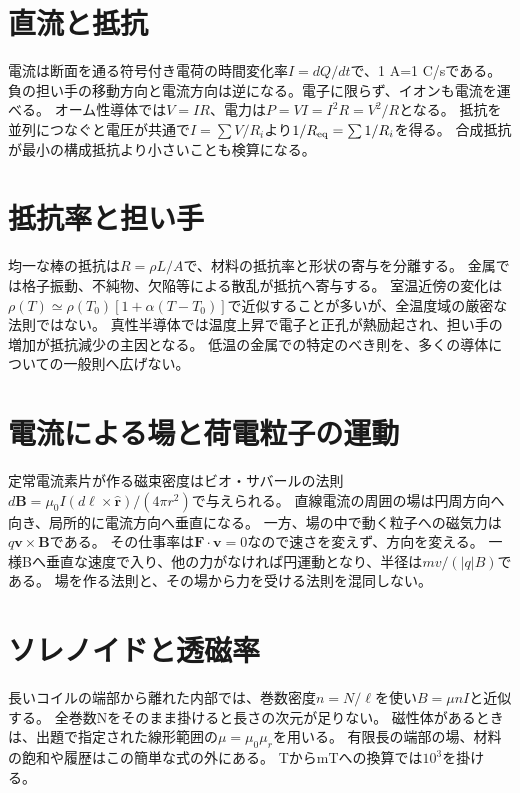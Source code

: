 \section{直流と抵抗}\label{theory:em:dc}
電流は断面を通る符号付き電荷の時間変化率$I=dQ/dt$で、1 A=1 C/sである。
負の担い手の移動方向と電流方向は逆になる。電子に限らず、イオンも電流を運べる。
オーム性導体では$V=IR$、電力は$P=VI=I^2R=V^2/R$となる。
抵抗を並列につなぐと電圧が共通で$I=\sum V/R_i$より$1/R_{\rm eq}=\sum1/R_i$を得る。
合成抵抗が最小の構成抵抗より小さいことも検算になる。\autocite{mit_em06,mit_em07}

\section{抵抗率と担い手}\label{theory:em:resistivity}
均一な棒の抵抗は$R=\rho L/A$で、材料の抵抗率と形状の寄与を分離する。
金属では格子振動、不純物、欠陥等による散乱が抵抗へ寄与する。
室温近傍の変化は$\rho(T)\simeq\rho(T_0)[1+\alpha(T-T_0)]$で近似することが多いが、全温度域の厳密な法則ではない。
真性半導体では温度上昇で電子と正孔が熱励起され、担い手の増加が抵抗減少の主因となる。
低温の金属での特定のべき則を、多くの導体についての一般則へ広げない。\autocite{mit_em06,mit_semiconductor}

\section{電流による場と荷電粒子の運動}\label{theory:em:biot}\label{theory:em:lorentz}
定常電流素片が作る磁束密度はビオ・サバールの法則
$d\mathbf B=\mu_0I(d\boldsymbol\ell\times\hat{\mathbf r})/(4\pi r^2)$で与えられる。
直線電流の周囲の場は円周方向へ向き、局所的に電流方向へ垂直になる。
一方、場の中で動く粒子への磁気力は$q\mathbf v\times\mathbf B$である。
その仕事率は$\mathbf F\cdot\mathbf v=0$なので速さを変えず、方向を変える。
一様Bへ垂直な速度で入り、他の力がなければ円運動となり、半径は$mv/(|q|B)$である。
場を作る法則と、その場から力を受ける法則を混同しない。\autocite{mit_em09,mit_lorentz}

\section{ソレノイドと透磁率}\label{theory:em:solenoid}
長いコイルの端部から離れた内部では、巻数密度$n=N/\ell$を使い$B=\mu nI$と近似する。
全巻数Nをそのまま掛けると長さの次元が足りない。
磁性体があるときは、出題で指定された線形範囲の$\mu=\mu_0\mu_r$を用いる。
有限長の端部の場、材料の飽和や履歴はこの簡単な式の外にある。
TからmTへの換算では$10^3$を掛ける。\autocite{mit_em09}

